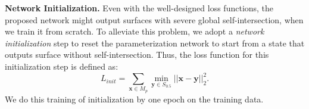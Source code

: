 \noindent \textbf{Network Initialization.}
Even with the well-designed loss functions, the proposed network might output surfaces with severe global self-intersection, when we train it from scratch.
%
To alleviate this problem, we adopt a \emph{network initialization} step to reset the parameterization network to start from a state that outputs surface without self-intersection. 
Thus, the loss function for this initialization step is defined as:
\begin{equation}
\label{equ:init}
L_{init} = \sum_{\mathbf{x}\in M_p}\min_{\mathbf{y}\in S_{0.5}}||\mathbf{x} - \mathbf{y}||_2^2.
\end{equation} 
We do this training of initialization by one epoch on the training data. 





